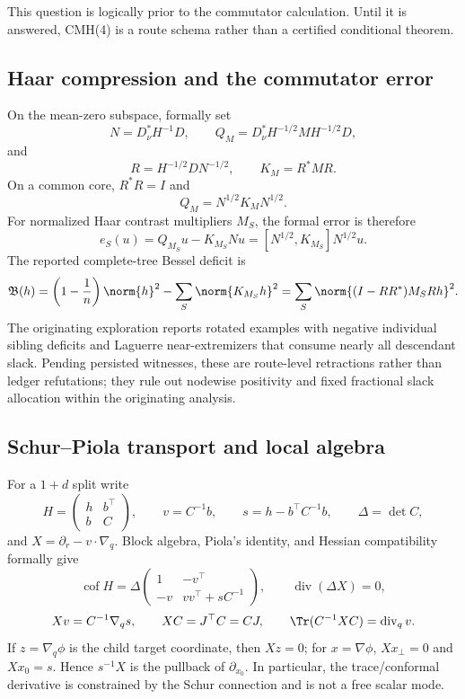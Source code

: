 \documentclass[../../main.tex]{subfiles}
\begin{document}
This question is logically prior to the commutator calculation. Until it is answered,
CMH(4) is a route schema rather than a certified conditional theorem.

\subsection{Haar compression and the commutator error}

On the mean-zero subspace, formally set
\[
  N=D_\nu^*H^{-1}D,
  \qquad
  Q_M=D_\nu^*H^{-1/2}MH^{-1/2}D,
\]
and
\[
  R=H^{-1/2}DN^{-1/2},
  \qquad K_M=R^*MR.
\]
On a common core, $R^*R=I$ and
\[
  Q_M=N^{1/2}K_MN^{1/2}.
\]
For normalized Haar contrast multipliers $M_S$, the formal error is therefore
\begin{equation}
  e_S(u)=Q_{M_S}u-K_{M_S}Nu
  =[N^{1/2},K_{M_S}]N^{1/2}u.
  \label{eq:mm-commutator-error}
\end{equation}
The reported complete-tree Bessel deficit is
\begin{equation}
  \mathfrak B(h)
  =\left(1-\frac1n\right)\norm{h}^2-\sum_S\norm{K_{M_S}h}^2
  =\sum_S\norm{(I-RR^*)M_SRh}^2.
  \label{eq:mm-bessel-deficit}
\end{equation}
The originating exploration reports rotated examples with negative individual sibling deficits
and Laguerre near-extremizers that consume nearly all descendant slack. Pending persisted
witnesses, these are route-level retractions rather than ledger refutations; they rule out
nodewise positivity and fixed fractional slack allocation within the originating analysis.

\subsection{Schur--Piola transport and local algebra}

For a $1+d$ split write
\[
  H=\begin{pmatrix}h&b^\top\\ b&C\end{pmatrix},\qquad
  v=C^{-1}b,\qquad s=h-b^\top C^{-1}b,\qquad \Delta=\det C,
\]
and $X=\partial_r-v\cdot\nabla_q$. Block algebra, Piola's identity, and Hessian compatibility
formally give
\[
  \operatorname{cof}H
  =\Delta\begin{pmatrix}1&-v^\top\\-v&vv^\top+sC^{-1}\end{pmatrix},
  \qquad
  \operatorname{div}(\Delta X)=0,
\]
\[
  Xv=C^{-1}\nabla_qs,
  \qquad XC=J^\top C=CJ,
  \qquad \Tr(C^{-1}XC)=\operatorname{div}_qv.
\]
If $z=\nabla_q\phi$ is the child target coordinate, then $Xz=0$; for
$x=\nabla\phi$, $Xx_\perp=0$ and $Xx_0=s$. Hence $s^{-1}X$ is the pullback of
$\partial_{x_0}$. In particular, the trace/conformal derivative is constrained by the Schur
connection and is not a free scalar mode.
\end{document}
